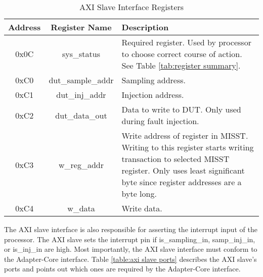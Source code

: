 \documentclass[]{report}
\begin{document}
\begin{table}[h]
	\centering
	\caption{AXI Slave Interface Registers}
	\begin{tabular}{|c|c|p{}|}
		\hline 
		Address & Register Name & Description \\ 
		\hline
		0x0C & sys\_status & Required register. Used by processor to choose correct course of action. See Table \ref{tab:register summary}.\\
		\hline
		0xC0 & dut\_sample\_addr & Sampling address.\\
		\hline
		0xC1 & dut\_inj\_addr & Injection address.\\
		\hline
		0xC2 & dut\_data\_out & Data to write to DUT. Only used during fault injection.\\
		\hline
		0xC3 & w\_reg\_addr & Write address of register in MISST. Writing to this register starts writing transaction to selected MISST register. Only uses least significant byte since register addresses are a byte long.\\
		\hline
		0xC4 & w\_data & Write data.\\
		\hline
	\end{tabular} 
	\label{table:axi slave int regs}
\end{table}

The AXI slave interface is also responsible for asserting the interrupt input of the processor. The AXI slave sets the interrupt pin if is\_sampling\_in, samp\_inj\_in, or is\_inj\_in are high. Most importantly, the AXI slave interface must conform to the Adapter-Core interface. Table \ref{table:axi slave ports} describes the AXI slave's ports and points out which ones are required by the Adapter-Core interface. 
\end{document}
